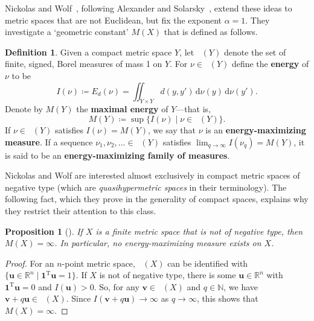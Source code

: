 \documentclass[a4paper, oneside, reqno]{amsart}
\newtheorem{prop}[theorem]{Proposition}
\theoremstyle{definition}
\newtheorem{definition}[theorem]{Definition}
\theoremstyle{remark}
\numberwithin{equation}{section}
\newcommand{\demph}[1]{\emph{#1}}
\renewcommand{\vec}{\mathbf}
\newcommand{\onevector}{\mathbf{1}}
\newcommand{\transpose}{\mathrm{T}}
\newcommand{\R}{\mathbb{R}}
\newcommand{\define}{\textbf}
\newcommand{\dd}{\mathrm{d}} %
\DeclareMathOperator{\measmassone}{\mathcal{M}_1}
\newcommand{\N}{\mathbb{N}}
\begin{document}
Nickolas and Wolf~\cite{Nickolas-Wolf:distance-geometry-I, Nickolas-Wolf:distance-geometry-II, Nickolas-Wolf:distance-geometry-III}, following Alexander and Solarsky~\cite{Alexander-Stolarsky:Extremal-problems}, extend these ideas to metric spaces that are not Euclidean, but fix the exponent \(\alpha = 1\). They investigate a `geometric constant' \(M(X)\) that is defined as follows.

\begin{definition}
\label{def:d-energy-infinite}
    Given a compact metric space \(Y\), let \(\measmassone(Y)\) denote the set of finite, signed, Borel measures of mass 1 on \(Y\). For \(\nu \in \measmassone(Y)\) define the \define{energy} of \(\nu\) to be
    \[
        I(\nu) \coloneq E_d(\nu) = \iint_{Y \times Y} d(y, y') \, \dd \nu(y) \,\dd \nu(y').
    \]
    Denote by \(M(Y)\) the \define{maximal energy} of \(Y\)---that is,
    \[
        M(Y) \coloneq
        \sup\{I(\nu) \mid \nu \in \measmassone(Y)\}.
    \]
    If \(\nu \in \measmassone(Y)\) satisfies \(I(\nu) = M(Y)\), we say that \(\nu\) is an \define{energy-maximizing measure}.  If a sequence \(\nu_1, \nu_2, \ldots \in \measmassone(Y)\) satisfies \(\lim_{q \to \infty} I(\nu_q) = M(Y)\), it is said to be an \define{energy-maximizing family of measures}.
\end{definition}

Nickolas and Wolf are interested almost exclusively in compact metric spaces of negative type (which are \demph{quasihypermetric spaces} in their terminology). The following fact, which they prove in the generality of compact spaces, explains why they restrict their attention to this class.

\begin{prop}[{\cite[Theorem~3.1]{Nickolas-Wolf:distance-geometry-I}}]
    \label{thm:non-negative-type-unbound-energy}
    If \(X\) is a finite metric space that is not of negative type, then \(M(X) = \infty\). In particular, no energy-maximizing measure exists on \(X\).
\end{prop}

\begin{proof}
    For an \(n\)-point metric space, \(\measmassone(X)\) can be identified with \(\{\vec{u} \in \R^n \mid \onevector^\transpose \vec{u} = 1\}\). If \(X\) is not of negative type, there is some \(\vec{u} \in \R^n\) with \(\onevector^\transpose \vec{u} = 0\) and \(I(\vec{u}) > 0\).  So, for any \(\vec{v} \in \measmassone(X)\) and \(q \in \N\), we have \(\vec{v} + q \vec{u} \in \measmassone(X)\). Since \(I(\vec{v} + q \vec{u}) \to \infty\) as \(q \to \infty\), this shows that \(M(X) = \infty\).
\end{proof}
\end{document}
